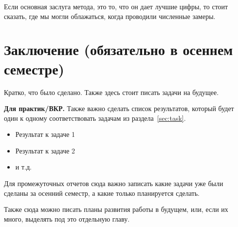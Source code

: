 Если основная заслуга метода, это то, что он дает лучшие цифры, то стоит сказать, где мы могли облажаться, когда проводили численные замеры. 

\section{Заключение (обязательно в осеннем семестре)}

Кратко, что было сделано. Также здесь стоит писать задачи на будущее.

\textbf{Для практик/ВКР.} Также важно сделать список результатов, который будет один к одному соответствовать задачам из раздела~\ref{sec:task}.

\begin{itemize}
\item Результат к задаче 1 
\item Результат к задаче 2
\item и т.д.
\end{itemize}
\noindent Для промежуточных отчетов сюда важно записать какие задачи уже были сделаны за осенний семестр, а какие только планируется сделать.

Также сюда можно писать планы развития работы в будущем, или, если их много, выделять под это отдельную главу.


\setmonofont[Mapping=tex-text]{CMU Typewriter Text}



